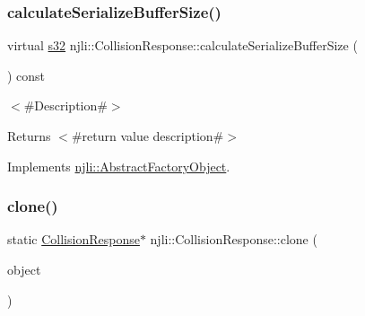 \mbox{\label{classnjli_1_1_collision_response_a8064aab248d93b5542b85406dc517084}} 
\subsubsection{\texorpdfstring{calculate\+Serialize\+Buffer\+Size()}{calculateSerializeBufferSize()}}
{\footnotesize\ttfamily virtual \mbox{\hyperlink{_util_8h_aa62c75d314a0d1f37f79c4b73b2292e2}{s32}} njli\+::\+Collision\+Response\+::calculate\+Serialize\+Buffer\+Size (\begin{DoxyParamCaption}{ }\end{DoxyParamCaption}) const\hspace{0.3cm}{\ttfamily [virtual]}}

$<$\#\+Description\#$>$

\begin{DoxyReturn}{Returns}
$<$\#return value description\#$>$ 
\end{DoxyReturn}


Implements \mbox{\hyperlink{classnjli_1_1_abstract_factory_object_a4763d05bc9dc37c559111f8bb30e1dd8}{njli\+::\+Abstract\+Factory\+Object}}.

\mbox{\label{classnjli_1_1_collision_response_a920e06f942aa95ce2ec26e207ed852cd}} 
\subsubsection{\texorpdfstring{clone()}{clone()}}
{\footnotesize\ttfamily static \mbox{\hyperlink{classnjli_1_1_collision_response}{Collision\+Response}}$\ast$ njli\+::\+Collision\+Response\+::clone (\begin{DoxyParamCaption}\item[{const \mbox{\hyperlink{classnjli_1_1_collision_response}{Collision\+Response}} \&}]{object }\end{DoxyParamCaption})\hspace{0.3cm}{\ttfamily [static]}}

